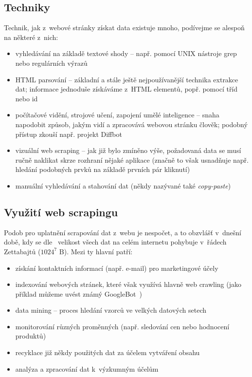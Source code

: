 \documentclass[thesis=B,czech]{FITthesis}[2012/06/26]
\begin{document}
\subsection{Techniky}
Technik, jak z~webové stránky získat data existuje mnoho, podívejme se alespoň na některé z~nich:
\begin{itemize}
	\item vyhledávání na základě textové shody -- např. pomocí UNIX nástroje grep nebo regulárních výrazů
	\item HTML parsování -- základní a stále ještě nejpoužívanější technika extrakce dat; informace jednoduše získáváme z~HTML elementů, popř. pomocí tříd nebo id
	\item počítačové vidění, strojové učení, zapojení umělé inteligence -- snaha napodobit způsob, jakým vidí a zpracovává webovou stránku člověk; podobný přístup zkouší např. projekt Diffbot~\cite{computer_vision}
	\item vizuální web scraping -- jak již bylo zmíněno výše, požadovaná data se musí ručně naklikat skrze rozhraní nějaké aplikace (značně to však usnadňuje např. hledání podobných prvků na základě prvních pár kliknutí)
	\item manuální vyhledávání a stahování dat (někdy nazývané také \emph{copy-paste})
\end{itemize}

\subsection{Využití web scrapingu}
Podob pro uplatnění scrapování dat z~webu je nespočet, a to obzvlášť v~dnešní době, kdy se dle~\cite{data_size} velikost všech dat na celém internetu pohybuje v~řádech Zettabajtů ($1024^{7}$ B). Mezi ty hlavní patří:
\begin{itemize}
	\item získání kontaktních informací (např. e-mail) pro marketingové účely
	\item indexování webových stránek, které však využívá hlavně web crawling (jako příklad můžeme uvést známý GoogleBot~\cite{google_bot})
	\item data mining -- proces hledání vzorců ve velkých datových setech~\cite{data_mining}
	\item monitorování různých proměnných (např. sledování cen nebo hodnocení produktů)
	\item recyklace již někdy použitých dat za účelem vytváření  obsahu
	\item analýza a zpracování dat k~výzkumným účelům
\end{itemize}
\end{document}
